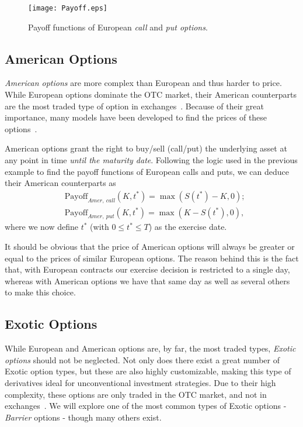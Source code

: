 \begin{figure}[!htb]
    \centering
      \texttt{[image: Payoff.eps]}
      \caption[Payoff functions of European call and put options]{Payoff functions of European \emph{call} and \emph{put options}.}\label{fig:Payoff}
    \end{figure}
    



\subsection{American Options}
\emph{American options} are more complex than European and thus harder to price. While European options dominate the OTC market, their American counterparts are the most traded type of option in exchanges~\cite{InvAmer}. Because of their great importance, many models have been developed to find the prices of these options~\cite{Longstaff}.

American options grant the right to buy/sell (call/put) the underlying asset at any point in time \emph{until the maturity date}. Following the logic used in the previous example to find the payoff functions of European calls and puts, we can deduce their American counterparts as
\begin{equation}
\begin{split}
&\text{Payoff}_{Amer,\ call}(K,t^*)=\max\left(S(t^*)-K,0\right);\\
&\text{Payoff}_{Amer,\ put}(K,t^*)=\max\left(K-S(t^*),0\right),
\end{split}
\end{equation}
\noindent where we now define $t^*$ (with $0\leq t^*\leq T$) as the exercise date.

It should be obvious that the price of American options will always be greater or equal to the prices of similar European options. The reason behind this is the fact that, with European contracts our exercise decision is restricted to a single day, whereas with American options we have that same day as well as several others to make this choice.


\subsection{Exotic Options}
While European and American options are, by far, the most traded types, \emph{Exotic options} should not be neglected. Not only does there exist a great number of Exotic option types, but these are also highly customizable, making this type of derivatives ideal for unconventional investment strategies. Due to their high complexity, these options are only traded in the OTC market, and not in exchanges~\cite{InvExotic}. We will explore one of the most common types of Exotic options - \emph{Barrier} options - though many others exist.


